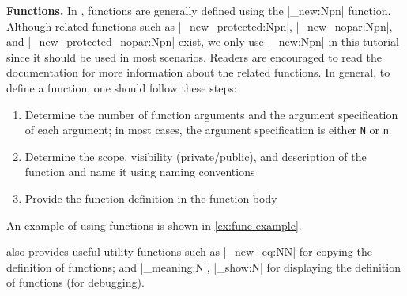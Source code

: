 \documentclass{ltugboat}
\begin{document}
\par\medskip\noindent\textbf{Functions.}
In \LTT{}, functions are generally defined using the \inltex|\cs_new:Npn| function.
Although related functions such as \inltex|\cs_new_protected:Npn|, \inltex|\cs_new_nopar:Npn|, and \inltex|\cs_new_protected_nopar:Npn| exist, we only use \inltex|\cs_new:Npn| in this tutorial since it should be used in most scenarios. 
Readers are encouraged to read the \LTT{} documentation for more information about the related functions.
In general, to define a function, one should follow these steps:
\begin{enumerate}
    \item Determine the number of function arguments and the argument specification of each argument; in most cases, the argument specification is either \verb|N| or \verb|n|
    \item Determine the scope, visibility (private/public), and description of the function and name it using \LTT{} naming conventions
    \item Provide the function definition in the function body
\end{enumerate}
An example of using functions is shown in \cref{ex:func-example}.



\LTT{} also provides useful utility functions such as \inltex|\cs_new_eq:NN| for copying the definition of functions; and \inltex|\cs_meaning:N|, \inltex|\cs_show:N| for displaying the definition of functions (for debugging).

\end{document}
